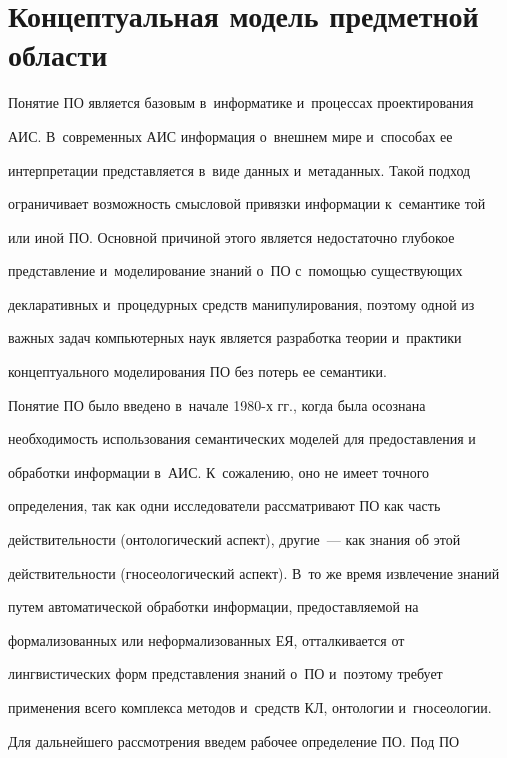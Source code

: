   


\section{Концептуальная модель предметной области}





  Понятие ПО является базовым в~информатике и~процессах проектирования 


АИС. В~современных АИС информация о~внешнем мире и~способах ее 


интерпретации представляется в~виде данных и~метаданных. Такой подход 


ограничивает возможность смысловой привязки информации к~семантике той 


или иной ПО. Основной причиной этого является недостаточно глубокое 


пред\-став\-ле\-ние и~моделирование знаний о~ПО с~помощью существующих 


декларативных и~процедурных средств манипулирования, поэтому одной из 


важных задач компьютерных наук является разработка теории и~практики 


концептуального моделирования ПО без потерь ее семантики. 


  


  Понятие ПО было введено в~начале 1980-х гг., когда была осознана 


необходимость использования семантических моделей для предоставления и~


обработки информации в~АИС. К~сожалению, оно не имеет точного 


определения, так как одни исследователи рассматривают ПО как часть 


действительности (онтологический аспект), другие~--- как знания об этой 


действительности (гносеологический аспект). В~то же время извлечение знаний 


путем автоматической обработки информации, предоставляемой на 


формализованных или неформализованных ЕЯ, отталкивается от 


лингвистических форм представления знаний о~ПО и~поэтому требует 


применения всего комплекса методов и~средств КЛ, онтологии и~гносеологии. 


Для дальнейшего рассмотрения введем рабочее определение ПО. Под ПО 


